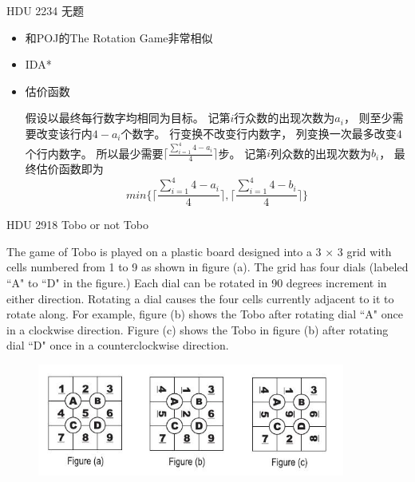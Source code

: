 \documentclass{beamer}
\begin{document}
\begin{frame}{HDU 2234 无题}

    \begin{itemize}
        \item 和POJ的The Rotation Game非常相似
        \item IDA*
        \item 估价函数
        
            假设以最终每行数字均相同为目标。
            记第$i$行众数的出现次数为$a_i$，
            则至少需要改变该行内$4-a_i$个数字。
            行变换不改变行内数字，
            列变换一次最多改变$4$个行内数字。
            所以最少需要$\lceil\frac{\sum_{i=1}^4{4-a_i}}{4}\rceil$步。
            记第$i$列众数的出现次数为$b_i$，
            最终估价函数即为
            $$min\{\lceil\frac{\sum_{i=1}^4{4-a_i}}{4}\rceil,\lceil\frac{\sum_{i=1}^4{4-b_i}}{4}\rceil\}$$
        \end{itemize}
    
\end{frame}

\begin{frame}{HDU 2918 Tobo or not Tobo}

    The game of Tobo is played on a plastic board designed into a 3 × 3 grid with cells numbered from 1 to 9 as shown in figure (a). The grid has four dials (labeled ``A" to ``D" in the figure.) Each dial can be rotated in 90 degrees increment in either direction. Rotating a dial causes the four cells currently adjacent to it to rotate along. For example, figure (b) shows the Tobo after rotating dial ``A" once in a clockwise direction. Figure (c) shows the Tobo in figure (b) after rotating dial ``D" once in a counterclockwise direction. 
    
    \begin{figure}
        \centering
        \includegraphics[width=0.9\textwidth]{hdu2918.jpeg}
    \end{figure}
    
\end{frame}
    
\end{document}
